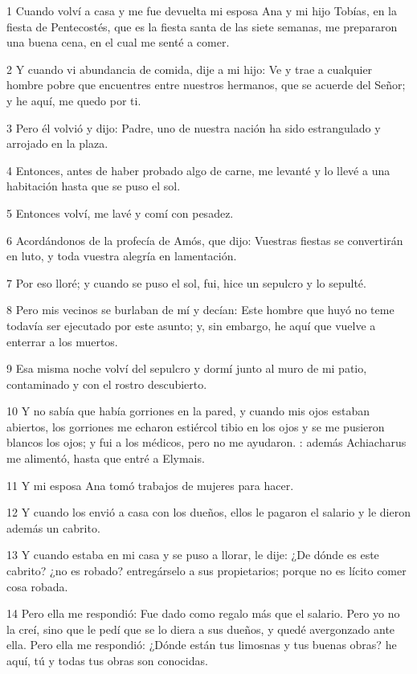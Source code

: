 \par 1 Cuando volví a casa y me fue devuelta mi esposa Ana y mi hijo Tobías, en la fiesta de Pentecostés, que es la fiesta santa de las siete semanas, me prepararon una buena cena, en el cual me senté a comer.
\par 2 Y cuando vi abundancia de comida, dije a mi hijo: Ve y trae a cualquier hombre pobre que encuentres entre nuestros hermanos, que se acuerde del Señor; y he aquí, me quedo por ti.
\par 3 Pero él volvió y dijo: Padre, uno de nuestra nación ha sido estrangulado y arrojado en la plaza.
\par 4 Entonces, antes de haber probado algo de carne, me levanté y lo llevé a una habitación hasta que se puso el sol.
\par 5 Entonces volví, me lavé y comí con pesadez.
\par 6 Acordándonos de la profecía de Amós, que dijo: Vuestras fiestas se convertirán en luto, y toda vuestra alegría en lamentación.
\par 7 Por eso lloré; y cuando se puso el sol, fui, hice un sepulcro y lo sepulté.
\par 8 Pero mis vecinos se burlaban de mí y decían: Este hombre que huyó no teme todavía ser ejecutado por este asunto; y, sin embargo, he aquí que vuelve a enterrar a los muertos.
\par 9 Esa misma noche volví del sepulcro y dormí junto al muro de mi patio, contaminado y con el rostro descubierto.
\par 10 Y no sabía que había gorriones en la pared, y cuando mis ojos estaban abiertos, los gorriones me echaron estiércol tibio en los ojos y se me pusieron blancos los ojos; y fui a los médicos, pero no me ayudaron. : además Achiacharus me alimentó, hasta que entré a Elymais.
\par 11 Y mi esposa Ana tomó trabajos de mujeres para hacer.
\par 12 Y cuando los envió a casa con los dueños, ellos le pagaron el salario y le dieron además un cabrito.
\par 13 Y cuando estaba en mi casa y se puso a llorar, le dije: ¿De dónde es este cabrito? ¿no es robado? entregárselo a sus propietarios; porque no es lícito comer cosa robada.
\par 14 Pero ella me respondió: Fue dado como regalo más que el salario. Pero yo no la creí, sino que le pedí que se lo diera a sus dueños, y quedé avergonzado ante ella. Pero ella me respondió: ¿Dónde están tus limosnas y tus buenas obras? he aquí, tú y todas tus obras son conocidas.

